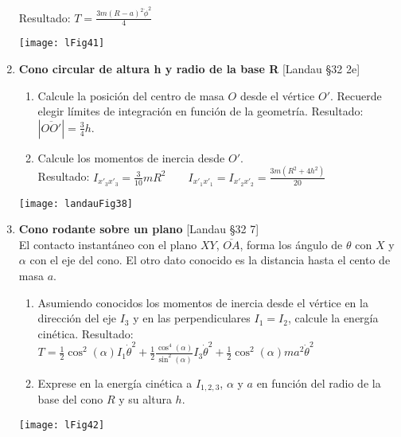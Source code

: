 \documentclass[11pt, spanish, a4paper, twoside]{article}
\begin{document}
\begin{enumerate}
\begin{minipage}[t][2.5cm]{0.62\textwidth}
			Resultado:
			\(
				T = \frac{3 m \left(R - a\right)^{2} \dot{\phi}^{2}}{4}
			\)
		\end{minipage}
		\begin{minipage}[c][1cm][t]{0.3\textwidth}
			\texttt{[image: lFig41]}
		\end{minipage}


	\item 
		\begin{minipage}[t][3.5cm]{0.72\textwidth}
			\textbf{Cono circular de altura h y radio de la base R} [Landau \S 32 2e]\begin{enumerate}
				\item Calcule la posición del centro de masa \(O\) desde el vértice \(O'\).
				Recuerde elegir límites de integración en función de la geometría.
				Resultado: \(|\overline{O O'}| = \frac{3}{4} h\).
				\item Calcule los momentos de inercia desde \(O'\).\\
				Resultado: \(I_{x'_3 x'_3} = \frac{3}{10} m R^{2} \qquad I_{x'_1 x'_1} = I_{x'_2 x'_2} = \frac{3 m \left(R^{2} + 4 h^{2}\right)}{20}\)
			\end{enumerate}
			\end{minipage}
			\begin{minipage}[c][1cm][t]{0.2\textwidth}
			\texttt{[image: landauFig38]}
		\end{minipage}

	\newpage

	\item 
		\begin{minipage}[t][3.5cm]{0.53\textwidth}
			\textbf{Cono rodante sobre un plano} [Landau \S 32 7]\\
				 El contacto instantáneo con el plano \(X Y\), \(\overline{O A}\), forma los ángulo de \(\theta\) con \(X\) y \(\alpha\) con el eje del cono.
				 El otro dato conocido es la distancia hasta el cento de masa \(a\).
				\begin{enumerate}
					\item Asumiendo conocidos los momentos de inercia desde el vértice en la dirección del eje \(I_3\) y en las perpendiculares \(I_1 = I_2\), calcule la energía cinética.
					Resultado:\\
					\(T = \frac{1}{2} \cos^2(\alpha) I_1 \dot{\theta}^{2} + \frac{1}{2} \frac{\cos^4(\alpha)}{\sin^2(\alpha)} I_3  \dot{\theta}^{2} + \frac{1}{2} \cos^2(\alpha) m a^{2} \dot{\theta}^{2} \)
					\item Exprese en la energía cinética a \(I_{1,2,3}\), \(\alpha\) y \(a\) en función del radio de la base del cono \(R\) y su altura \(h\).
				\end{enumerate}
		\end{minipage}
		\begin{minipage}[c][0cm][t]{0.4\textwidth}
			\texttt{[image: lFig42]}
		\end{minipage}

\end{enumerate}
\end{document}
